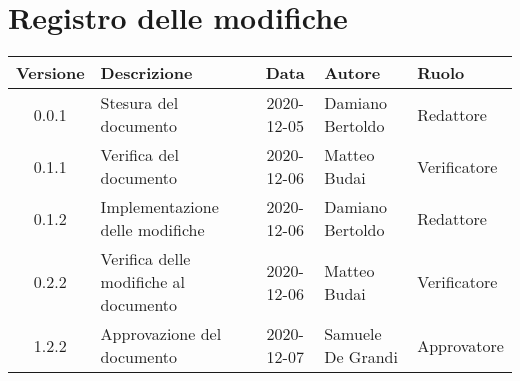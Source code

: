\section*{Registro delle modifiche}

\begin{center}
	\begin{longtable}{|c|p{3.5cm}|c|p{3.1cm}|p{3cm}|}
	\hline
	\rowcolor{lighter-grayer}
	\textbf{Versione} & \textbf{Descrizione} & \textbf{Data} & \textbf{Autore} & \textbf{Ruolo} \\
	\hline
	\endfirsthead

	0.0.1 & Stesura del documento & 2020-12-05 & Damiano Bertoldo & Redattore \\
	\hline
	0.1.1 & Verifica del documento & 2020-12-06 & Matteo Budai & Verificatore \\
	\hline
	0.1.2 & Implementazione delle modifiche & 2020-12-06 & Damiano Bertoldo & Redattore \\
	\hline
	0.2.2 & Verifica delle modifiche al documento & 2020-12-06 & Matteo Budai & Verificatore \\
	\hline
	1.2.2 & Approvazione del documento & 2020-12-07 & Samuele De Grandi & Approvatore \\
	\hline

	\end{longtable}
\end{center}

